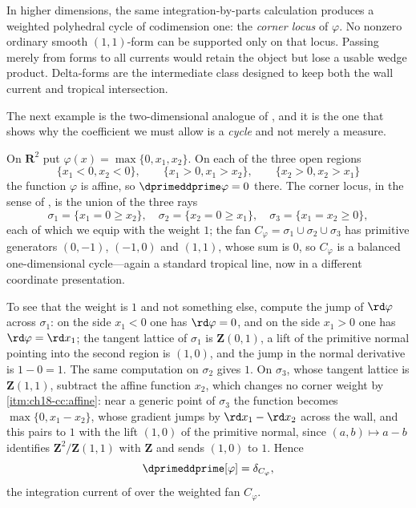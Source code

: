 In higher dimensions, the same integration-by-parts calculation produces a
weighted polyhedral cycle of codimension one: the \emph{corner locus} of
$\varphi$.  No nonzero ordinary smooth $(1,1)$-form can be supported only
on that locus.  Passing merely from forms to all currents would retain the
object but lose a usable wedge product.  Delta-forms are the intermediate
class designed to keep both the wall current and tropical intersection.

The next example is the two-dimensional analogue of
, and it is the one that shows why the coefficient
we must allow is a \emph{cycle} and not merely a measure.

\begin{example}
\label{ex:ch18-corner-max}
On $\mathbf R^2$ put $\varphi(x)=\max\{0,x_1,x_2\}$.  On each of the three
open regions
\[
 \{x_1<0,x_2<0\},\qquad\{x_1>0,x_1>x_2\},\qquad\{x_2>0,x_2>x_1\}
\]
the function $\varphi$ is affine, so $\dprimeddprime\varphi=0$ there.  The
corner locus, in the sense of , is the union of
the three rays
\[
 \sigma_1=\{x_1=0\geq x_2\},\quad
 \sigma_2=\{x_2=0\geq x_1\},\quad
 \sigma_3=\{x_1=x_2\geq0\},
\]
each of which we equip with the weight $1$; the fan
$C_\varphi=\sigma_1\cup\sigma_2\cup\sigma_3$ has primitive generators
$(0,-1)$, $(-1,0)$ and $(1,1)$, whose sum is $0$, so $C_\varphi$ is a
balanced one-dimensional cycle---again a standard tropical line, now in a
different coordinate presentation.

To see that the weight is $1$ and not something else, compute the jump of
$\rd\varphi$ across $\sigma_1$: on the side $x_1<0$ one has
$\rd\varphi=0$, and on the side $x_1>0$ one has $\rd\varphi=\rd x_1$; the
tangent lattice of $\sigma_1$ is $\mathbf Z(0,1)$, a lift of the primitive
normal pointing into the second region is $(1,0)$, and the jump in the
normal derivative is $1-0=1$.  The same computation on $\sigma_2$ gives
$1$.  On $\sigma_3$, whose tangent lattice is $\mathbf Z(1,1)$, subtract the
affine function $x_2$, which changes no corner weight by
\,\cref{itm:ch18-cc:affine}: near a generic
point of $\sigma_3$ the function becomes $\max\{0,x_1-x_2\}$, whose gradient
jumps by $\rd x_1-\rd x_2$ across the wall, and this pairs to $1$ with the
lift $(1,0)$ of the primitive normal, since $(a,b)\mapsto a-b$ identifies
$\mathbf Z^2/\mathbf Z(1,1)$ with $\mathbf Z$ and sends $(1,0)$ to $1$.
Hence
\begin{equation}
\label{eq:ch18-corner-max}
 \dprimeddprime[\varphi]=\delta_{C_\varphi},
\end{equation}
the integration current of  over the
weighted fan $C_\varphi$.


\end{example}
